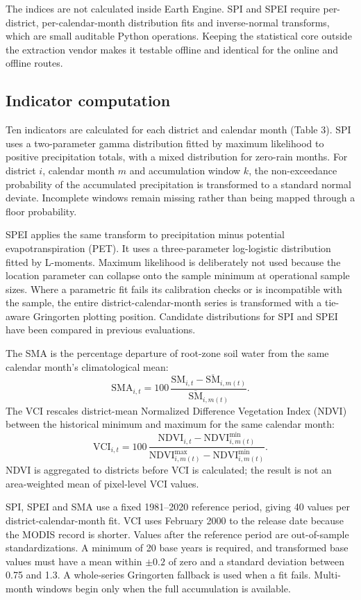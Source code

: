 \documentclass[11pt,a4paper]{article}
\begin{document}
The indices are not calculated inside Earth Engine. SPI and SPEI require per-district, per-calendar-month distribution fits and inverse-normal transforms, which are small auditable Python operations. Keeping the statistical core outside the extraction vendor makes it testable offline and identical for the online and offline routes.

\subsection*{Indicator computation}
Ten indicators are calculated for each district and calendar month (Table 3). SPI uses a two-parameter gamma distribution fitted by maximum likelihood to positive precipitation totals, with a mixed distribution for zero-rain months\citep{McKee1993}. For district $i$, calendar month $m$ and accumulation window $k$, the non-exceedance probability of the accumulated precipitation is transformed to a standard normal deviate. Incomplete windows remain missing rather than being mapped through a floor probability.

SPEI applies the same transform to precipitation minus potential evapotranspiration (PET). It uses a three-parameter log-logistic distribution fitted by L-moments\citep{VicenteSerrano2010,Begueria2014,Hosking1990}. Maximum likelihood is deliberately not used because the location parameter can collapse onto the sample minimum at operational sample sizes. Where a parametric fit fails its calibration checks or is incompatible with the sample, the entire district-calendar-month series is transformed with a tie-aware Gringorten plotting position\citep{Gringorten1963}. Candidate distributions for SPI and SPEI have been compared in previous evaluations\citep{Stagge2015}.

The SMA is the percentage departure of root-zone soil water from the same calendar month's climatological mean:
\[
\mathrm{SMA}_{i,t}=100\,\frac{\mathrm{SM}_{i,t}-\overline{\mathrm{SM}}_{i,m(t)}}{\overline{\mathrm{SM}}_{i,m(t)}}.
\]
The VCI rescales district-mean Normalized Difference Vegetation Index (NDVI) between the historical minimum and maximum for the same calendar month\citep{Kogan1995}:
\[
\mathrm{VCI}_{i,t}=100\,\frac{\mathrm{NDVI}_{i,t}-\mathrm{NDVI}^{\min}_{i,m(t)}}{\mathrm{NDVI}^{\max}_{i,m(t)}-\mathrm{NDVI}^{\min}_{i,m(t)}}.
\]
NDVI is aggregated to districts before VCI is calculated; the result is not an area-weighted mean of pixel-level VCI values.

SPI, SPEI and SMA use a fixed 1981--2020 reference period, giving 40 values per district-calendar-month fit. VCI uses February 2000 to the release date because the MODIS record is shorter. Values after the reference period are out-of-sample standardizations. A minimum of 20 base years is required, and transformed base values must have a mean within $\pm0.2$ of zero and a standard deviation between 0.75 and 1.3. A whole-series Gringorten fallback is used when a fit fails. Multi-month windows begin only when the full accumulation is available.
\end{document}

